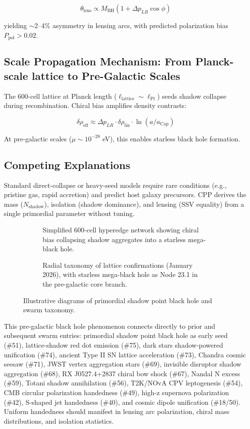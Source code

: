 \documentclass[11pt]{article}
\begin{document}
\[
\theta_{\text{lens}} \propto M_{\text{BH}} (1 + \Delta p_{LR} \cos\phi)
\]

yielding $\sim$2--4\% asymmetry in lensing arcs, with predicted polarization bias $P_{\text{pol}} > 0.02$.

\subsection{Scale Propagation Mechanism: From Planck-scale lattice to Pre-Galactic Scales}
The 600-cell lattice at Planck length ($\ell_{\text{lattice}} \sim \ell_{\text{Pl}}$) seeds shadow collapse during recombination. Chiral bias amplifies density contrasts:

\[
\delta \rho_{\text{eff}} \approx \Delta p_{LR} \cdot \delta \rho_{\text{lin}} \cdot \ln(a / a_{\text{Cap}})
\]

At pre-galactic scales ($\mu \sim 10^{-28}$ eV), this enables starless black hole formation.

\subsection{Competing Explanations}
Standard direct-collapse or heavy-seed models require rare conditions (e.g., pristine gas, rapid accretion) and predict host galaxy precursors. CPP derives the mass ($N_{\text{shadow}}$), isolation (shadow dominance), and lensing (SSV equality) from a single primordial parameter without tuning.

\begin{figure}[htbp]
\centering
\begin{subfigure}{0.45\textwidth}
\centering
\caption{Simplified 600-cell hyperedge network showing chiral bias collapsing shadow aggregates into a starless mega-black hole.}
\label{fig:shadow-bh}
\end{subfigure}
\hfill
\begin{subfigure}{0.45\textwidth}
\centering
\caption{Radial taxonomy of lattice confirmations (January 2026), with starless mega-black hole as Node 23.1 in the pre-galactic core branch.}
\label{fig:taxonomy}
\end{subfigure}
\caption{Illustrative diagrams of primordial shadow point black hole and swarm taxonomy.}
\end{figure}

This pre-galactic black hole phenomenon connects directly to prior and subsequent swarm entries: primordial shadow point black hole as early seed (\#51), lattice-shadow red dot emission (\#75), dark stars shadow-powered unification (\#74), ancient Type II SN lattice acceleration (\#73), Chandra cosmic seesaw (\#71), JWST vertex aggregation stars (\#69), invisible disruptor shadow aggregation (\#68), RX J0527.4+2837 chiral bow shock (\#67), Nandal N excess (\#59), Totani shadow annihilation (\#56), T2K/NOvA CPV leptogenesis (\#54), CMB circular polarization handedness (\#49), high-z supernova polarization (\#42), S-shaped jet handedness (\#40), and cosmic dipole unification (\#18/50). Uniform handedness should manifest in lensing arc polarization, chiral mass distributions, and isolation statistics.
\end{document}
